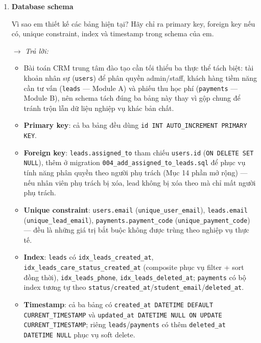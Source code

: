 \begin{enumerate}[label = \textbf{\arabic*.}, leftmargin=*]
    \item \textbf{Database schema}

    Vì sao em thiết kế các bảng hiện tại? Hãy chỉ ra primary key, foreign key nếu có, unique constraint, index và timestamp trong schema của em.

    \hspace*{-0.6cm} $\rightarrow$ \textit{Trả lời:}

    \begin{itemize}[leftmargin = 0.55cm, label = $\bullet$]
        \item Bài toán CRM trung tâm đào tạo cần tối thiểu ba thực thể tách biệt: tài khoản nhân sự (\texttt{users}) để phân quyền admin/staff, khách hàng tiềm năng cần tư vấn (\texttt{leads} — Module A) và phiếu thu học phí (\texttt{payments} — Module B), nên schema tách đúng ba bảng này thay vì gộp chung để tránh trộn lẫn dữ liệu nghiệp vụ khác bản chất.
        \item \textbf{Primary key}: cả ba bảng đều dùng \texttt{id INT AUTO\_INCREMENT PRIMARY KEY}.
        \item \textbf{Foreign key}: \texttt{leads.assigned\_to} tham chiếu \texttt{users.id} (\texttt{ON DELETE SET NULL}), thêm ở migration \texttt{004\_add\_assigned\_to\_leads.sql} để phục vụ tính năng phân quyền theo người phụ trách (Mục 14 phần mở rộng) — nếu nhân viên phụ trách bị xóa, lead không bị xóa theo mà chỉ mất người phụ trách.
        \item \textbf{Unique constraint}: \texttt{users.email} (\texttt{unique\_user\_email}), \texttt{leads.email} (\texttt{unique\_lead\_email}), \texttt{payments.payment\_code} (\texttt{unique\_payment\_code}) — đều là những giá trị bắt buộc không được trùng theo nghiệp vụ thực tế.
        \item \textbf{Index}: \texttt{leads} có \texttt{idx\_leads\_created\_at}, \texttt{idx\_leads\_care\_status\_created\_at} (composite phục vụ filter + sort đồng thời), \texttt{idx\_leads\_phone}, \texttt{idx\_leads\_deleted\_at}; \texttt{payments} có bộ index tương tự theo \texttt{status}/\texttt{created\_at}/\texttt{student\_email}/\texttt{deleted\_at}.
        \item \textbf{Timestamp}: cả ba bảng có \texttt{created\_at DATETIME DEFAULT CURRENT\_TIMESTAMP} và \texttt{updated\_at DATETIME NULL ON UPDATE CURRENT\_TIMESTAMP}; riêng \texttt{leads}/\texttt{payments} có thêm \texttt{deleted\_at DATETIME NULL} phục vụ soft delete.
    \end{itemize}


\end{enumerate}

